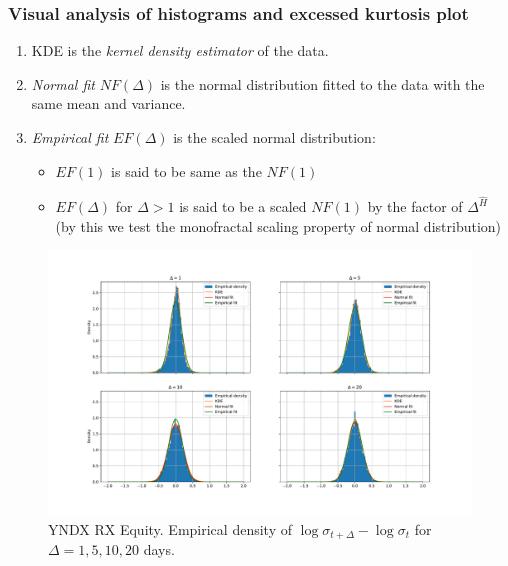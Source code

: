         \subsubsection{Visual analysis of histograms and excessed kurtosis plot}
            \begin{enumerate}
                \item KDE is the \emph{kernel density estimator} of the data.
                \item \emph{Normal fit} $NF(\Delta)$ is the normal distribution fitted to the data with the same mean and variance.
                \item \emph{Empirical fit} $EF(\Delta)$ is the scaled normal distribution:
                    \begin{itemize}
                        \item $EF(1)$ is said to be same as the $NF(1)$
                        \item $EF(\Delta)$ for $\Delta > 1$ is said to be a scaled $NF(1)$ by the 
                            factor of $\Delta^{\hat{H}}$ (by this we test the monofractal scaling 
                            property of normal distribution)
                    \end{itemize}
            \end{enumerate}

            \begin{figure}[htbp]
                \includegraphics[width=\textwidth]{fig/YNDX RX Equity 30 Lag Hists.pdf}
                \caption{YNDX RX Equity. Empirical density of $\log \sigma_{t+\Delta} - \log \sigma_{t}$ for $\Delta = 1, 5, 10, 20$ days.}
                \label{fig:lagHists}
            \end{figure}

